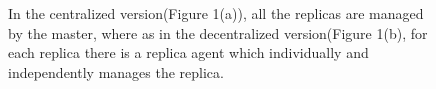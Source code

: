\documentclass[a4paper,10pt]{article}
\begin{document}
\begin{figure}
\centering
{}
\caption{\small In the centralized version(Figure 1(a)), all the replicas are managed by the master, where as in the decentralized version(Figure 1(b), for each replica there is a replica agent which individually and independently manages the replica.}
\label{fig:async}
\end{figure}
\end{document}
